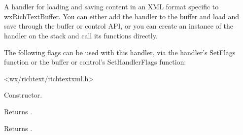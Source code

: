 \section{}\label{wxrichtextxmlhandler}

A handler for loading and saving content in an XML format specific
to wxRichTextBuffer. You can either add the handler to the buffer
and load and save through the buffer or control API, or you can
create an instance of the handler on the stack and call its
functions directly.


The following flags can be used with this handler, via
the handler's SetFlags function or the buffer or control's
SetHandlerFlags function:

\twocolwidtha{7cm}
\begin{twocollist}\itemsep=0pt
\end{twocollist}




<wx/richtext/richtextxml.h>





\label{wxrichtextxmlhandlerwxrichtextxmlhandler}


Constructor.

\label{wxrichtextxmlhandlercanload}


Returns \true.

\label{wxrichtextxmlhandlercansave}


Returns \true.

